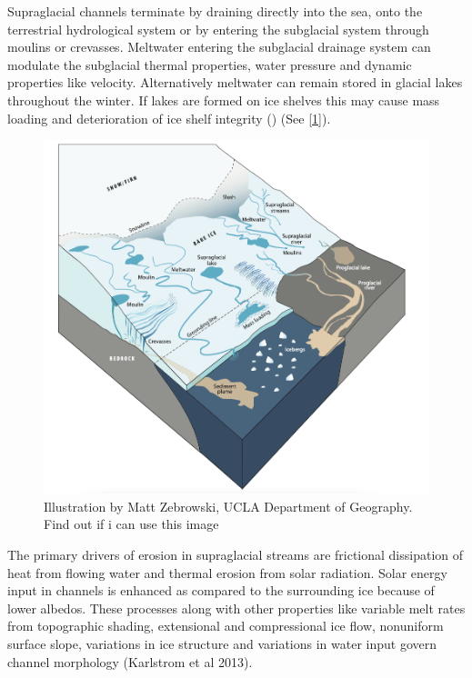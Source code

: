 Supraglacial channels terminate by draining directly into the sea, onto the terrestrial hydrological system or by entering the subglacial system through moulins or crevasses. Meltwater entering the subglacial drainage system can modulate the subglacial thermal properties, water pressure and dynamic properties like velocity. Alternatively meltwater can remain stored in glacial lakes throughout the winter. If lakes are formed on ice shelves this may cause mass loading and deterioration of ice shelf integrity (\cite{ice_shelf_stability}) (See [\ref{fig:schematic_drain}]).
\begin{figure}[h]
    \centering
    \includegraphics[width = 14cm]{figures/Introduction/schematic_dranage_system.png}
    \caption{ Illustration by Matt Zebrowski, UCLA Department of Geography. Find out if i can use this image}
    \label{fig:schematic_drain}
\end{figure}
\newline
The primary drivers of erosion in supraglacial streams are frictional dissipation of heat from flowing water and thermal erosion from solar radiation. Solar energy input in channels is enhanced as compared to the surrounding ice because of lower albedos. These processes along with other properties like variable melt rates from topographic shading, extensional and compressional ice flow, nonuniform surface slope, variations in ice structure and variations in water input govern channel morphology (Karlstrom et al 2013). 
\newline
\newline

